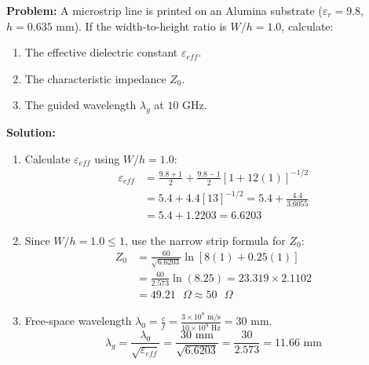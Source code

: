 \documentclass[12pt,a4paper]{article}
\begin{document}
\begin{tcolorbox}[examplebox, title={Worked Numerical: Microstrip Design \& Wavelength Calculation}]
  \textbf{Problem:} A microstrip line is printed on an Alumina substrate ($\varepsilon_r = 9.8$, $h = 0.635\text{ mm}$). If the width-to-height ratio is $W/h = 1.0$, calculate:
  \begin{enumerate}[label=(\alph*), noitemsep]
    \item The effective dielectric constant $\varepsilon_{eff}$.
    \item The characteristic impedance $Z_0$.
    \item The guided wavelength $\lambda_g$ at $10\text{ GHz}$.
  \end{enumerate}
  \tcblower
  \textbf{Solution:}
  \begin{enumerate}[label=(\alph*), itemsep=4pt]
    \item Calculate $\varepsilon_{eff}$ using $W/h = 1.0$:
      \begin{equation}
        \begin{aligned}
          \varepsilon_{eff} &= \frac{9.8 + 1}{2} + \frac{9.8 - 1}{2} \left[ 1 + 12(1) \right]^{-1/2} \\
          &= 5.4 + 4.4 \left[ 13 \right]^{-1/2} = 5.4 + \frac{4.4}{3.6055} \\
          &= 5.4 + 1.2203 = 6.6203
        \end{aligned}
      \end{equation}
    \item Since $W/h = 1.0 \le 1$, use the narrow strip formula for $Z_0$:
      \begin{equation}
        \begin{aligned}
          Z_0 &= \frac{60}{\sqrt{6.6203}} \ln\left[ 8(1) + 0.25(1) \right] \\
          &= \frac{60}{2.573} \ln(8.25) = 23.319 \times 2.1102 \\
          &= 49.21\text{ }\Omega \approx 50\text{ }\Omega
        \end{aligned}
      \end{equation}
    \item Free-space wavelength $\lambda_0 = \frac{c}{f} = \frac{3 \times 10^8\text{ m/s}}{10 \times 10^9\text{ Hz}} = 30\text{ mm}$.
      \begin{equation}
        \lambda_g = \frac{\lambda_0}{\sqrt{\varepsilon_{eff}}} = \frac{30\text{ mm}}{\sqrt{6.6203}} = \frac{30}{2.573} = 11.66\text{ mm}
      \end{equation}
  \end{enumerate}
\end{tcolorbox}
\end{document}
